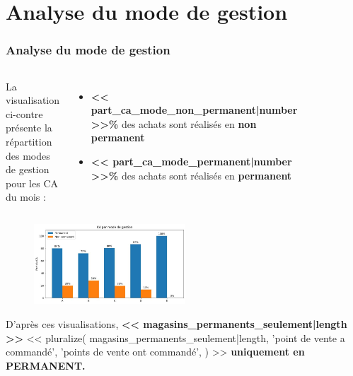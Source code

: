 \section{Analyse du mode de gestion}

\begin{frame}
    \tiny
    \frametitle{Analyse du mode de gestion}

    \begin{columns}
        La visualisation ci-contre présente la répartition des modes de gestion pour les CA du mois :

        \begin{itemize}
            \item \textbf{<< part_ca_mode_non_permanent|number >>\%} des achats sont réalisés en \textbf{non permanent}
            \item \textbf{<< part_ca_mode_permanent|number >>\%} des achats sont réalisés en \textbf{permanent}
        \end{itemize}

        \centering

        \begin{figure}
            \centering
            \includegraphics[width=1\textwidth]{assets/__ca_total_par_mode_de_gestion}
        \end{figure}
    \end{columns}

    \begin{figure}[h]
        \centering
        \includegraphics[height=3cm]{assets/__ca_magasins_par_mode_de_gestion}
    \end{figure}

    D’après ces visualisations, \textbf{<< magasins_permanents_seulement|length >>}
    << pluralize(
        magasins_permanents_seulement|length,
        'point de vente a commandé',
        'points de vente ont commandé',
    ) >>
    \textbf{uniquement en PERMANENT.}
\end{frame}
